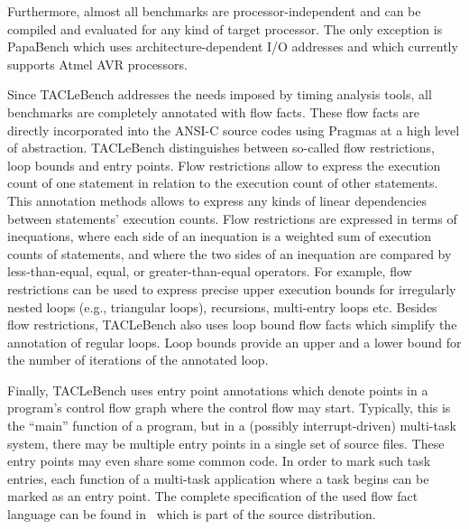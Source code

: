 \documentclass[a4paper,UKenglish]{oasics}
\newcommand{\code}[1]{{\small{\texttt{#1}}}}
\begin{document}
Furthermore, almost all benchmarks are processor-independent and can
be compiled and evaluated for any kind of target processor.
The only exception is PapaBench which uses architecture-dependent
I/O addresses and which currently supports Atmel AVR processors.

Since TACLeBench addresses the needs imposed by timing analysis tools,
all benchmarks are completely annotated with flow facts.
These flow facts are directly incorporated into the ANSI-C source codes using
Pragmas at a high level of abstraction.
TACLeBench distinguishes between so-called flow restrictions, loop bounds and entry points.
Flow restrictions allow to express the execution count of one statement in relation to the execution count of other statements.
This annotation methods allows to express any kinds of linear dependencies between statements' execution counts.
Flow restrictions are expressed in terms of inequations, where each side of an inequation is a weighted sum of execution counts of statements, and where the two sides of an inequation are compared by less-than-equal, equal, or greater-than-equal operators.
For example, flow restrictions can be used to express precise upper execution bounds for irregularly nested loops (e.g., triangular loops), recursions, multi-entry loops etc.
Besides flow restrictions, TACLeBench also uses loop bound flow facts which simplify the annotation of regular loops.
Loop bounds provide an upper and a lower bound for the number of iterations of the annotated loop.

Finally, TACLeBench uses entry point annotations which denote points in a program's control flow graph where the control flow may start.
Typically, this is the ``main'' function of a program, but in a (possibly interrupt-driven) multi-task system, there may be multiple entry points in a single set of source files.
These entry points may even share some common code.
In order to mark such task entries, each function of a multi-task application where a task begins can be marked as an entry point.
%
%
%
%
The complete specification of the used flow fact language can be found in~\cite{flowfacts} which is part of the source distribution.
\end{document}
